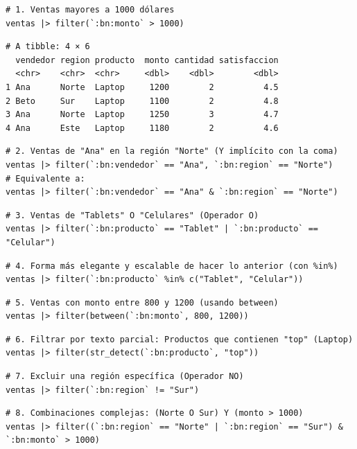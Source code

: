 \documentclass[8pt]{beamer}
\begin{document}
\begin{frame}[fragile]
\begin{lstlisting}[style=RScript]
# 1. Ventas mayores a 1000 dólares
ventas |> filter(`:bn:monto` > 1000)
\end{lstlisting}
\begin{lstlisting}[style=RConsole]
# A tibble: 4 × 6
  vendedor region producto  monto cantidad satisfaccion
  <chr>    <chr>  <chr>     <dbl>    <dbl>        <dbl>
1 Ana      Norte  Laptop     1200        2          4.5
2 Beto     Sur    Laptop     1100        2          4.8
3 Ana      Norte  Laptop     1250        3          4.7
4 Ana      Este   Laptop     1180        2          4.6
\end{lstlisting}

\begin{lstlisting}[style=RScript]
# 2. Ventas de "Ana" en la región "Norte" (Y implícito con la coma)
ventas |> filter(`:bn:vendedor` == "Ana", `:bn:region` == "Norte")
# Equivalente a:
ventas |> filter(`:bn:vendedor` == "Ana" & `:bn:region` == "Norte")
\end{lstlisting}

\begin{lstlisting}[style=RScript]
# 3. Ventas de "Tablets" O "Celulares" (Operador O)
ventas |> filter(`:bn:producto` == "Tablet" | `:bn:producto` == "Celular")
\end{lstlisting}

\begin{lstlisting}[style=RScript]
# 4. Forma más elegante y escalable de hacer lo anterior (con %in%)
ventas |> filter(`:bn:producto` %in% c("Tablet", "Celular"))
\end{lstlisting}
\end{frame}




\begin{frame}[fragile]
\begin{lstlisting}[style=RScript]
# 5. Ventas con monto entre 800 y 1200 (usando between)
ventas |> filter(between(`:bn:monto`, 800, 1200))
\end{lstlisting}

\begin{lstlisting}[style=RScript]
# 6. Filtrar por texto parcial: Productos que contienen "top" (Laptop)
ventas |> filter(str_detect(`:bn:producto`, "top"))
\end{lstlisting}

\begin{lstlisting}[style=RScript]
# 7. Excluir una región específica (Operador NO)
ventas |> filter(`:bn:region` != "Sur")
\end{lstlisting}

\begin{lstlisting}[style=RScript]
# 8. Combinaciones complejas: (Norte O Sur) Y (monto > 1000)
ventas |> filter((`:bn:region` == "Norte" | `:bn:region` == "Sur") & `:bn:monto` > 1000)
\end{lstlisting}
\end{frame}
\end{document}
